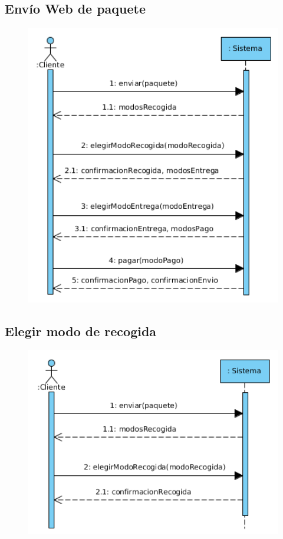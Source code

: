 \subsection{Envío Web de paquete}
\begin{figure}[H]
	\centering
	\includegraphics[width=16cm]{54}
\end{figure}
\subsection{Elegir modo de recogida}
\begin{figure}[H]
	\centering
	\includegraphics[width=16cm]{55}
\end{figure}
